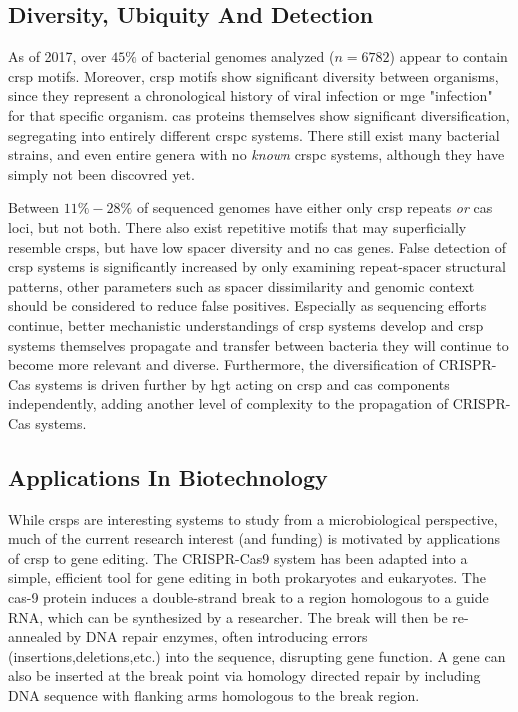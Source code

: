 \documentclass[12pt,letter]{article}
\begin{document}
\subsection*{Diversity, Ubiquity And Detection}
As of 2017, over $45\%$ of bacterial genomes analyzed ($n=6782$) appear to contain \ac{crsp} motifs\citep{crispdb}.
Moreover, \ac{crsp} motifs show significant diversity between organisms, since they represent a chronological history of viral infection or \ac{mge} "infection" for that specific organism\citep{crispgen}.
\ac{cas} proteins themselves show significant diversification, segregating into entirely different \ac{crspc} systems\citep{evocas}.
There still exist many bacterial strains, and even entire genera with no \textit{known} \ac{crspc} systems, although they have simply not been discovred yet\citep{ineqcas,casguild}.\par
Between $11\%-28\%$ of sequenced genomes have either only \ac{crsp} repeats \textit{or} \ac{cas} loci, but not both\citep{ineqcas}.
There also exist repetitive motifs that may superficially resemble \ac{crsp}s, but have low spacer diversity and no \ac{cas} genes\citep{ineqcas}.
False detection of \ac{crsp} systems is significantly increased by only examining repeat-spacer structural patterns, other parameters such as spacer dissimilarity and genomic context should be considered to reduce false positives\citep{ineqcas}.
Especially as sequencing efforts continue, better mechanistic understandings of \ac{crsp} systems develop and \ac{crsp} systems themselves propagate and transfer between bacteria they will continue to become more relevant and diverse\citep{crispgen}.
Furthermore, the diversification of CRISPR-Cas systems is driven further by \ac{hgt} acting on \ac{crsp} and \ac{cas} components independently, adding another level of complexity to the propagation of CRISPR-Cas systems\citep{crispgen}.
\subsection*{Applications In Biotechnology}
While \ac{crsp}s are interesting systems to study from a microbiological perspective, much of the current research interest (and funding) is motivated by applications of \ac{crsp} to gene editing.
The CRISPR-Cas9 system has been adapted into a simple, efficient tool for gene editing in both prokaryotes and eukaryotes\citep{crispgen}.
The \ac{cas}-9 protein induces a double-strand break to a region homologous to a guide RNA, which can be synthesized by a researcher.
The break will then be re-annealed by DNA repair enzymes, often introducing errors (insertions,deletions,etc.) into the sequence, disrupting gene function\citep{crispgen}.
A gene can also be inserted at the break point via homology directed repair by including DNA sequence with flanking arms homologous to the break region\citep{crispgen}.
\end{document}
